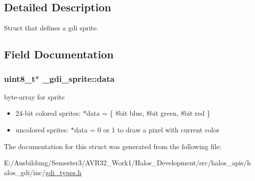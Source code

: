 \subsection{Detailed Description}
Struct that defines a gdi sprite. 

\subsection{Field Documentation}
\hypertarget{struct__gdi__sprite_a6abd9b710c9d6511bdd300879274a43}{
\subsubsection[{data}]{\setlength{\rightskip}{0pt plus 5cm}uint8\_\-t$\ast$ {\bf \_\-gdi\_\-sprite::data}}}
\label{struct__gdi__sprite_a6abd9b710c9d6511bdd300879274a43}


byte-array for sprite 

\begin{itemize}
\item 24-bit colored sprites: $\ast$data = \{ 8bit blue, 8bit green, 8bit red \} \item uncolored sprites: $\ast$data = 0 or 1 to draw a pixel with current color \end{itemize}


The documentation for this struct was generated from the following file:\begin{CompactItemize}
\item 
E:/Ausbildung/Semester3/AVR32\_\-Work1/Halos\_\-Development/src/halos\_\-apis/halos\_\-gdi/inc/\hyperlink{gdi__types_8h}{gdi\_\-types.h}\end{CompactItemize}
